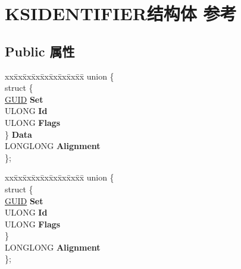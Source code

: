 \hypertarget{struct_k_s_i_d_e_n_t_i_f_i_e_r}{}\section{K\+S\+I\+D\+E\+N\+T\+I\+F\+I\+E\+R结构体 参考}
\label{struct_k_s_i_d_e_n_t_i_f_i_e_r}
\subsection*{Public 属性}
\begin{DoxyCompactItemize}
\item 
\mbox{\label{struct_k_s_i_d_e_n_t_i_f_i_e_r_a001b2d882fb0007e10f143cb707f0160}} 
\begin{tabbing}
xx\=xx\=xx\=xx\=xx\=xx\=xx\=xx\=xx\=\kill
union \{\\
\>struct \{\\
\>\>\hyperlink{interface_g_u_i_d}{GUID} {\bfseries Set}\\
\>\>ULONG {\bfseries Id}\\
\>\>ULONG {\bfseries Flags}\\
\>\} {\bfseries Data}\\
\>LONGLONG {\bfseries Alignment}\\
\}; \\

\end{tabbing}\item 
\mbox{\label{struct_k_s_i_d_e_n_t_i_f_i_e_r_af55bada3c6851d382dc35de63082b423}} 
\begin{tabbing}
xx\=xx\=xx\=xx\=xx\=xx\=xx\=xx\=xx\=\kill
union \{\\
\mbox{\label{union_k_s_i_d_e_n_t_i_f_i_e_r_1_1_0D2451_afe4dd8571bb41d7a24e5bd8768ddc3c2}} 
\>struct \{\\
\>\>\hyperlink{interface_g_u_i_d}{GUID} {\bfseries Set}\\
\>\>ULONG {\bfseries Id}\\
\>\>ULONG {\bfseries Flags}\\
\>\} \\
\>LONGLONG {\bfseries Alignment}\\
\}; \\


\end{tabbing}
\end{DoxyCompactItemize}
